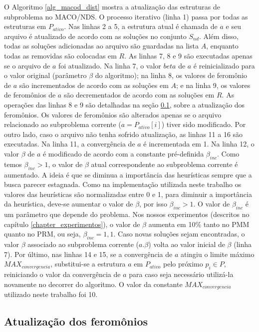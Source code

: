 O Algoritmo \ref{alg_macod_dist} mostra a atualização das estruturas de subproblema no MACO/NDS. O processo iterativo (linha 1) passa por todas as estruturas em $P_{ativo}$. Nas linhas 2 a 5, a estrutura atual é chamada de $a$ e seu arquivo é atualizado de acordo com as soluções no conjunto $S_{nd}$. Além disso, todas as soluções adicionadas ao arquivo são guardadas na lista $A$, enquanto todas as removidas são colocadas em $R$. As linhas 7, 8 e 9 são executadas apenas se o arquivo de $a$ foi atualizado. Na linha 7, o valor $beta$ de $a$ é reinicializado para o valor original (parâmetro $\beta$ do algoritmo); na linha 8, os valores de feromônio de $a$ são incrementados de acordo com as soluções em $A$; e na linha 9, os valores de feromônios de $a$ são decrementados de acordo com as soluções em $R$. As operações das linhas 8 e 9 são detalhadas na seção \ref{section_macod_pheromones}, sobre a atualização dos feromônios. Os valores de feromônios são alterados apenas se o arquivo relacionado ao subproblema corrente ($a = P_{ativo}[i]$) tiver sido modificado. Por outro lado, caso o arquivo não tenha sofrido atualização, as linhas 11 a 16 são executadas. Na linha 11, a convergência de $a$ é incrementada em 1. Na linha 12, o valor $\beta$ de $a$ é modificado de acordo com a constante pré-definida $\beta_{inc}$. Como temos $\beta_{inc} > 1$, o valor de $\beta$ atual correspondente ao subproblema corrente é aumentado. A ideia é que se diminua a importância das heurísticas sempre que a busca parecer estagnada. Como na implementação utilizada neste trabalho os valores das heurísticas são normalizadas entre 0 e 1, para diminuir a importância da heurística, deve-se aumentar o valor de $\beta$, por isso $\beta_{inc} > 1$. O valor de $\beta_{inc}$ é um parâmetro que depende do problema. Nos nossos experimentos (descritos no capítulo \ref{chapter_experimentos}), o valor de $\beta$ aumenta em 10\% tanto no PMM quanto no PRM, ou seja, $\beta_{inc} = 1,1$. Caso novas soluções sejam encontradas, o valor $\beta$ associado ao subproblema corrente ($a.\beta$) volta ao valor inicial de $\beta$ (linha 7). Por último, nas linhas 14 e 15, se a convergência de $a$ atingiu o limite máximo $MAX_{convergencia}$, substitui-se a estrutura $a$ em $P_{ativo}$ pelo próximo $p_i \in P$, reiniciando o valor da convergência de $a$ para caso seja necessário utilizá-la novamente no decorrer do algoritmo. O valor da constante $MAX_{convergencia}$ utilizado neste trabalho foi 10.

\subsection{Atualização dos feromônios}
\label{section_macod_pheromones}

